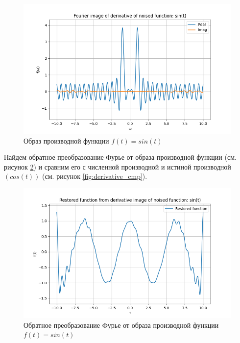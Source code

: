 \begin{figure}[ht!]
    \centering
    \includegraphics[width=\textwidth]{../results/10/noised_sin_image_derivative.png}
    \caption{Образ производной функции $f(t) = sin(t)$}
    \label{fig:noised_sin_image_deriviate}
\end{figure}
Найдем обратное преобразование Фурье от образа производной функции (см. рисунок \ref{fig:noised_sin_image_deriviate_restored}) и сравним его с численной производной и истиной производной $(cos(t))$ (см. рисунок \ref{fig:derivative_cmp}).

\begin{figure}[ht!]
    \centering
    \includegraphics[width=\textwidth]{../results/10/noised_sin_image_derivative_restored.png}
    \caption{Обратное преобразование Фурье от образа производной функции $f(t) = sin(t)$}
    \label{fig:noised_sin_image_deriviate_restored}
\end{figure}


